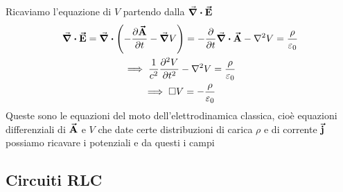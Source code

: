 Ricaviamo l'equazione di $V$ partendo dalla $\div \vb*{\va{E}}$
\begin{gather*}
	\div\vba E= \div \left( -\pdv{\vba A}{t} -\grad V \right) =-\pdv{t}\div\vba A-\laplacian V=\frac{\rho}{\epsilon_0}\\
	\implies \frac{1}{c^2}\pdv[2]{V}{t} -\laplacian V=\frac{\rho}{\epsilon_0}\\
	\implies \square V=-\frac{\rho}{\epsilon_0}
\end{gather*}
Queste sono le equazioni del moto dell'elettrodinamica classica, cioè equazioni differenziali di $\vb*{\va{A}}$ e $V$ che date certe distribuzioni di carica $\rho$ e di corrente $\vb*{\va{j}}$ possiamo ricavare i potenziali e da questi i campi


\subsection{Circuiti RLC}

